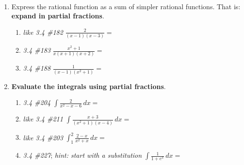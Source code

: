 \documentclass[11pt,fleqn]{article}
\begin{document}
\renewcommand{\headrulewidth}{0pt}
\newcommand{\blank}[1]{\rule{#1}{0.75pt}}
\newcommand{\bc}{\begin{center}}
\newcommand{\ec}{\end{center}}
\newcommand{\ds}{\displaystyle}

\vspace*{-0.7in}

\begin{center}
  \large
  \\
   
\end{center}

\begin{enumerate}
\item Express the rational function as a sum of simpler rational functions.  That is: \textbf{expand in partial fractions}.

	\begin{enumerate}
	\item \emph{like 3.4 \#182} \qquad $\ds \frac{2}{(x-1)(x-3)} = $
	\vfill
	
	\item \emph{3.4 \#183} \qquad $\ds \frac{x^2 + 1}{x(x+1)(x+2)} = $
	\vfill
	
	\item \emph{3.4 \#188} \qquad $\ds \frac{1}{(x-1)(x^2+1)} = $
	\vfill
	\end{enumerate}

\item \textbf{Evaluate the integrals using partial fractions}.

	\begin{enumerate}
	\item \emph{3.4 \#204} \qquad $\ds \int \frac{2}{x^2 - x - 6}\,dx = $
	\vfill

\clearpage\newpage
	\item \emph{like 3.4 \#211} \qquad $\ds \int \frac{x+3}{(x^2+1)(x-4)}\,dx = $
	\vfill

	\item \emph{like 3.4 \#203} \qquad $\ds \int_1^2 \frac{2-x}{x^2+x}\,dx = $
	\vfill

	\item \emph{3.4 \#227}; \emph{hint: start with a substitution} \qquad $\ds \int \frac{1}{1+e^x}\,dx =$
	\vfill
	\end{enumerate}
\end{enumerate}
\end{document}

